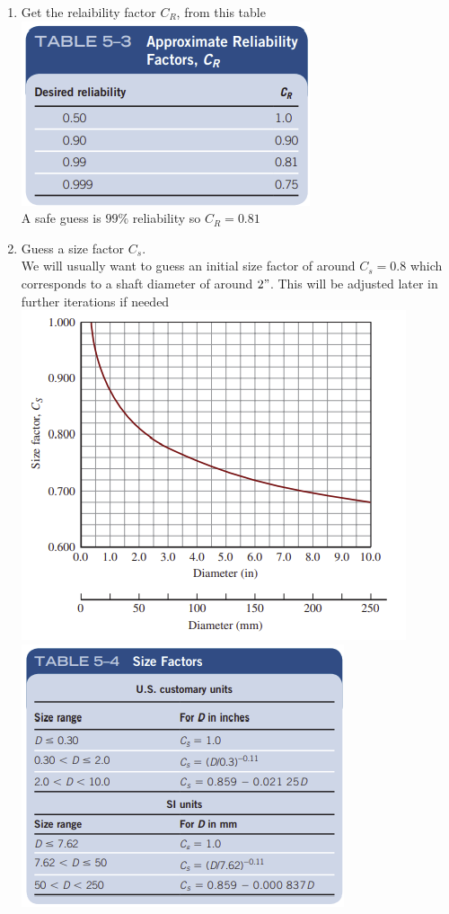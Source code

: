 \documentclass[11pt, fleqn]{article}
\begin{document}
\begin{enumerate}
    \item Get the relaibility factor $C_R$, from this table\\
    \includegraphics[scale=1]{Shafts/Tab5-3.png}\\
    A safe guess is $99\%$ reliability so $C_R=0.81$
    \item \label{find Cs} Guess a size factor $C_s$.\\
    We will usually want to guess an initial size factor of around $C_s=0.8$ which corresponds to a shaft diameter of around $2"$. This will be adjusted later in further iterations if needed\\
    \includegraphics[scale=1.1]{Shafts/Fig5-12.png}\\
    \includegraphics[scale=1]{Shafts/Tab5-4.png}

\end{enumerate}
\end{document}
